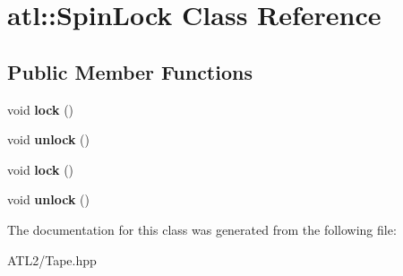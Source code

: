 \hypertarget{classatl_1_1_spin_lock}{\section{atl\+:\+:Spin\+Lock Class Reference}
\label{classatl_1_1_spin_lock}
}
\subsection*{Public Member Functions}
\begin{DoxyCompactItemize}
\item 
\hypertarget{classatl_1_1_spin_lock_a80d85e14e0a6f7dbd8751f5c2ee35df6}{void {\bfseries lock} ()}\label{classatl_1_1_spin_lock_a80d85e14e0a6f7dbd8751f5c2ee35df6}

\item 
\hypertarget{classatl_1_1_spin_lock_a7c5feec049e1cc748d121c470d0a104e}{void {\bfseries unlock} ()}\label{classatl_1_1_spin_lock_a7c5feec049e1cc748d121c470d0a104e}

\item 
\hypertarget{classatl_1_1_spin_lock_a80d85e14e0a6f7dbd8751f5c2ee35df6}{void {\bfseries lock} ()}\label{classatl_1_1_spin_lock_a80d85e14e0a6f7dbd8751f5c2ee35df6}

\item 
\hypertarget{classatl_1_1_spin_lock_a7c5feec049e1cc748d121c470d0a104e}{void {\bfseries unlock} ()}\label{classatl_1_1_spin_lock_a7c5feec049e1cc748d121c470d0a104e}

\end{DoxyCompactItemize}


The documentation for this class was generated from the following file\+:\begin{DoxyCompactItemize}
\item 
A\+T\+L2/Tape.\+hpp\end{DoxyCompactItemize}
